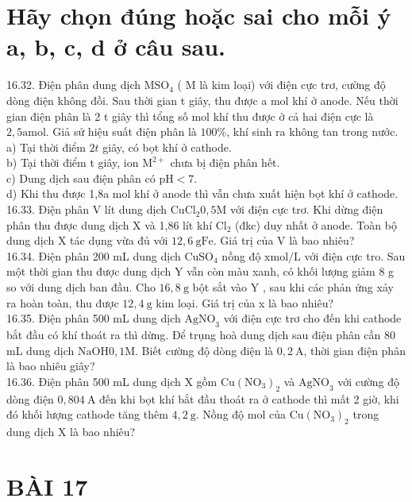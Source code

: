 \documentclass[10pt]{article}
\begin{document}
\section*{Hãy chọn đúng hoặc sai cho mỗi ý a, b, c, d ở câu sau.}
16.32. Điện phân dung dịch $\mathrm{MSO}_{4}$ ( M là kim loại) với điện cực trơ, cường độ dòng điện không đồi. Sau thời gian t giây, thu được a mol khí ở anode. Nếu thời gian điện phân là 2 t giây thì tổng số mol khí thu được ở cả hai điện cực là $2,5 \mathrm{a} \mathrm{mol}$. Giả sử hiệu suất điện phân là $100 \%$, khí sinh ra không tan trong nước.\\
a) Tại thời điểm $2 t$ giây, có bọt khí ở cathode.\\
b) Tại thời điểm t giây, ion $\mathrm{M}^{2+}$ chưa bị điện phân hết.\\
c) Dung dịch sau điện phân có $\mathrm{pH}<7$.\\
d) Khi thu được 1,8a mol khí ở anode thì vẫn chưa xuất hiện bọt khí ở cathode.\\
16.33. Điện phân V lít dung dịch $\mathrm{CuCl}_{2} 0,5 \mathrm{M}$ với điện cực trơ. Khi dừng điện phân thu được dung dịch X và 1,86 lít khí $\mathrm{Cl}_{2}$ (đkc) duy nhất ở anode. Toàn bộ dung dịch X tác dụng vừa đủ với $12,6 \mathrm{~g} \mathrm{Fe}$. Giá trị của V là bao nhiêu?\\
16.34. Điện phân 200 mL dung dịch $\mathrm{CuSO}_{4}$ nồng độ $\mathrm{x} \mathrm{mol} / \mathrm{L}$ với điện cực tro. Sau một thời gian thu được dung dịch Y vẫn còn màu xanh, có khối lượng giảm 8 g so với dung dịch ban đầu. Cho $16,8 \mathrm{~g}$ bột sắt vào Y , sau khi các phản ứng xảy ra hoàn toàn, thu được $12,4 \mathrm{~g}$ kim loại. Giá trị của x là bao nhiêu?\\
16.35. Điện phân 500 mL dung dịch $\mathrm{AgNO}_{3}$ với điện cực trơ cho đến khi cathode bắt đầu có khí thoát ra thì dừng. Để trụng hoà dung dịch sau điện phân cần 80 mL dung dịch $\mathrm{NaOH} 0,1 \mathrm{M}$. Biết cường độ dòng điện là $0,2 \mathrm{~A}$, thời gian điện phân là bao nhiêu giây?\\
16.36. Điện phân 500 mL dung dịch X gồm $\mathrm{Cu}\left(\mathrm{NO}_{3}\right)_{2}$ và $\mathrm{AgNO}_{3}$ với cường độ dòng điện $0,804 \mathrm{~A}$ đến khi bọt khí bắt đầu thoát ra ở cathode thì mất 2 giờ, khi đó khối lượng cathode tăng thêm $4,2 \mathrm{~g}$. Nồng độ mol của $\mathrm{Cu}\left(\mathrm{NO}_{3}\right)_{2}$ trong dung dịch X là bao nhiêu?

\section*{BÀI 17}
\end{document}
